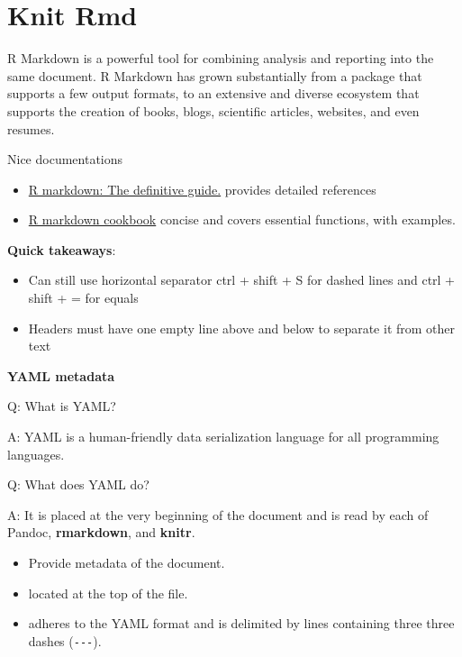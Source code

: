 \documentclass[
]{book}
\providecommand{\tightlist}{%
  \setlength{\itemsep}{0pt}\setlength{\parskip}{0pt}}
\begin{document}
\chapter{Knit Rmd}\label{knit-rmd}

R Markdown is a powerful tool for combining analysis and reporting into the same document. R Markdown has grown substantially from a package that supports a few output formats, to an extensive and diverse ecosystem that supports the creation of books, blogs, scientific articles, websites, and even resumes.

Nice documentations

\begin{itemize}
\tightlist
\item
  \href{https://bookdown.org/yihui/rmarkdown}{R markdown: The definitive guide.} provides detailed references
\item
  \href{https://bookdown.org/yihui/rmarkdown-cookbook/}{R markdown cookbook} concise and covers essential functions, with examples.
\end{itemize}

\textbf{Quick takeaways}:

\begin{itemize}
\tightlist
\item
  Can still use horizontal separator ctrl + shift + S for dashed lines and ctrl + shift + = for equals
\item
  Headers must have one empty line above and below to separate it from other text
\end{itemize}

\textbf{YAML metadata}

Q: What is YAML?

A: YAML is a human-friendly data serialization language for all programming languages.

Q: What does YAML do?

A: It is placed at the very beginning of the document and is read by each of Pandoc, \textbf{rmarkdown}, and \textbf{knitr}.

\begin{itemize}
\tightlist
\item
  Provide metadata of the document.
\item
  located at the top of the file.
\item
  adheres to the YAML format and is delimited by lines containing three three dashes (\texttt{-\/-\/-}).
\end{itemize}
\end{document}
